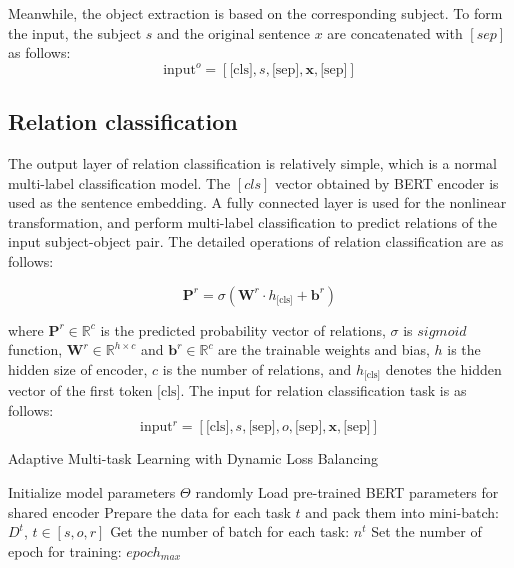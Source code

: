 \documentclass[11pt,a4paper]{article}
\begin{document}
Meanwhile, the object extraction is based on the corresponding subject. To form the input, the subject $s$ and the original sentence $x$ are concatenated with $[sep]$ as follows:
\begin{equation}
    \text{input}^o = [\text{[cls]}, s, \text{[sep]}, \mathbf{x}, \text{[sep]}]
\end{equation}

\subsection{Relation classification}
The output layer of relation classification is relatively simple, which is a normal multi-label classification model. The $[cls]$ vector obtained by BERT encoder is used as the sentence embedding. A fully connected layer is used for the nonlinear transformation, and perform multi-label classification to predict relations of the input subject-object pair. The detailed operations of relation classification are as follows:

\begin{equation}
    \mathbf{P}^{r} = \sigma(\mathbf{W}^{r} \cdot h_{\text{[cls]}} + \mathbf{b}^{r}) 
\end{equation}

where $\mathbf{P}^{r} \in \mathbb{R}^c$ is the predicted probability vector of relations, $\sigma$ is $sigmoid$ function, $\mathbf{W}^{r} \in \mathbb{R}^{h \times c}$ and $\mathbf{b}^{r} \in \mathbb{R}^c$ are the trainable weights and bias, $h$ is the hidden size of encoder, $c$ is the number of relations, and $h_{\text{[cls]}}$ denotes the hidden vector of the first token $\text{[cls]}$. The input for relation classification task is as follows:
\begin{equation}
    \text{input}^r = [\text{[cls]}, s, \text{[sep]}, o, \text{[sep]}, \mathbf{x}, \text{[sep]}]
\end{equation}

\begin{algorithm}[ht]
\caption{Adaptive Multi-task Learning with Dynamic Loss Balancing}\label{algo:mtl}
\LinesNumbered Initialize model parameters $\Theta$ randomly\;
Load pre-trained BERT parameters for shared encoder\;
Prepare the data for each task $t$ and pack them into mini-batch: $D^t$, $t\in [s, o, r]$ \;
Get the number of batch for each task: $n^t$\; 
Set the number of epoch for training: $epoch_{max}$\;
\end{algorithm}
\end{document}
